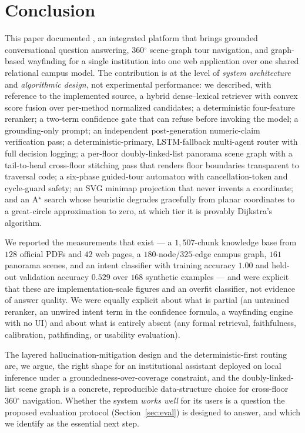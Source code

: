 \section{Conclusion}
\label{sec:conclusion}
This paper documented \system{}, an integrated platform that brings
grounded conversational question answering, 360$^{\circ}$ scene-graph tour
navigation, and graph-based wayfinding for a single institution into one
web application over one shared relational campus model. The contribution
is at the level of \emph{system architecture} and \emph{algorithmic
design}, not experimental performance: we described, with reference to the
implemented source, a hybrid dense--lexical retriever with convex score
fusion over per-method normalized candidates; a deterministic four-feature
reranker; a two-term confidence gate that can refuse before invoking the
model; a grounding-only prompt; an independent post-generation
numeric-claim verification pass; a deterministic-primary, LSTM-fallback
multi-agent router with full decision logging; a per-floor doubly-linked-list
panorama scene graph with a tail-to-head cross-floor stitching pass that
renders floor boundaries transparent to traversal code; a six-phase
guided-tour automaton with cancellation-token and cycle-guard safety; an
SVG minimap projection that never invents a coordinate; and an A$^{\star}$
search whose heuristic degrades gracefully from planar coordinates to a
great-circle approximation to zero, at which tier it is provably Dijkstra's
algorithm.

We reported the measurements that exist --- a $1{,}507$-chunk knowledge
base from $128$ official PDFs and $42$ web pages, a $180$-node/$325$-edge
campus graph, $161$ panorama scenes, and an intent classifier with training
accuracy $1.00$ and held-out validation accuracy $0.529$ over $168$
synthetic examples --- and were explicit that these are implementation-scale
figures and an overfit classifier, not evidence of answer quality. We were
equally explicit about what is partial (an untrained reranker, an unwired
intent term in the confidence formula, a wayfinding engine with no UI) and
about what is entirely absent (any formal retrieval, faithfulness,
calibration, pathfinding, or usability evaluation).

The layered hallucination-mitigation design and the deterministic-first
routing are, we argue, the right shape for an institutional assistant
deployed on local inference under a groundedness-over-coverage constraint,
and the doubly-linked-list scene graph is a concrete, reproducible
data-structure choice for cross-floor 360$^{\circ}$ navigation. Whether the
system \emph{works well} for its users is a question the proposed
evaluation protocol (Section~\ref{sec:eval}) is designed to answer, and
which we identify as the essential next step.
